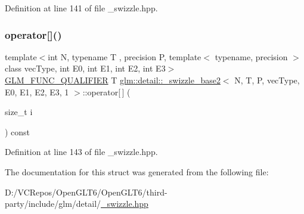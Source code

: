 Definition at line 141 of file \+\_\+swizzle.\+hpp.

\mbox{\label{structglm_1_1detail_1_1__swizzle__base2_3_01_n_00_01_t_00_01_p_00_01vec_type_00_01_e0_00_01_e1_00_01_e2_00_01_e3_00_011_01_4_ad3ffb03de9a95ef467776571f51d40e7}} 
\subsubsection{\texorpdfstring{operator[]()}{operator[]()}}
{\footnotesize\ttfamily template$<$int N, typename T , precision P, template$<$ typename, precision $>$ class vec\+Type, int E0, int E1, int E2, int E3$>$ \\
\mbox{\hyperlink{setup_8hpp_a33fdea6f91c5f834105f7415e2a64407}{G\+L\+M\+\_\+\+F\+U\+N\+C\+\_\+\+Q\+U\+A\+L\+I\+F\+I\+ER}} T \mbox{\hyperlink{structglm_1_1detail_1_1__swizzle__base2}{glm\+::detail\+::\+\_\+swizzle\+\_\+base2}}$<$ N, T, P, vec\+Type, E0, E1, E2, E3, 1 $>$\+::operator\mbox{[}$\,$\mbox{]} (\begin{DoxyParamCaption}\item[{size\+\_\+t}]{i }\end{DoxyParamCaption}) const\hspace{0.3cm}{\ttfamily [inline]}}



Definition at line 143 of file \+\_\+swizzle.\+hpp.



The documentation for this struct was generated from the following file\+:\begin{DoxyCompactItemize}
\item 
D\+:/\+V\+C\+Repos/\+Open\+G\+L\+T6/\+Open\+G\+L\+T6/third-\/party/include/glm/detail/\mbox{\hyperlink{__swizzle_8hpp}{\+\_\+swizzle.\+hpp}}\end{DoxyCompactItemize}

